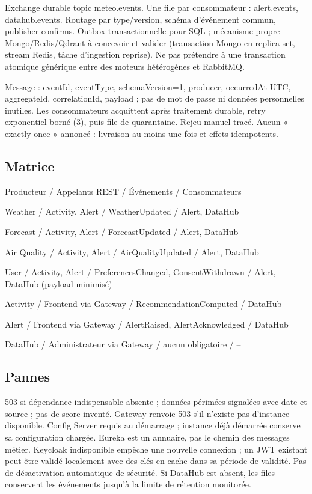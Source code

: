 \documentclass[10pt,a4paper]{article}
\begin{document}
Exchange durable topic meteo.events. Une file par consommateur : alert.events, datahub.events. Routage par type/version, schéma d'événement commun, publisher confirms. Outbox transactionnelle pour SQL ; mécanisme propre Mongo/Redis/Qdrant à concevoir et valider (transaction Mongo en replica set, stream Redis, tâche d'ingestion reprise). Ne pas prétendre à une transaction atomique générique entre des moteurs hétérogènes et RabbitMQ.\par

Message : eventId, eventType, schemaVersion=1, producer, occurredAt UTC, aggregateId, correlationId, payload ; pas de mot de passe ni données personnelles inutiles. Les consommateurs acquittent après traitement durable, retry exponentiel borné (3), puis file de quarantaine. Rejeu manuel tracé. Aucun « exactly once » annoncé : livraison au moins une fois et effets idempotents.\par

\subsection*{Matrice}

Producteur / Appelants REST / Événements / Consommateurs\par
Weather / Activity, Alert / WeatherUpdated / Alert, DataHub\par
Forecast / Activity, Alert / ForecastUpdated / Alert, DataHub\par
Air Quality / Activity, Alert / AirQualityUpdated / Alert, DataHub\par
User / Activity, Alert / PreferencesChanged, ConsentWithdrawn / Alert, DataHub (payload minimisé)\par
Activity / Frontend via Gateway / RecommendationComputed / DataHub\par
Alert / Frontend via Gateway / AlertRaised, AlertAcknowledged / DataHub\par
DataHub / Administrateur via Gateway / aucun obligatoire /  -- \par

\subsection*{Pannes}

503 si dépendance indispensable absente ; données périmées signalées avec date et source ; pas de score inventé. Gateway renvoie 503 s'il n'existe pas d'instance disponible. Config Server requis au démarrage ; instance déjà démarrée conserve sa configuration chargée. Eureka est un annuaire, pas le chemin des messages métier. Keycloak indisponible empêche une nouvelle connexion ; un JWT existant peut être validé localement avec des clés en cache dans sa période de validité. Pas de désactivation automatique de sécurité. Si DataHub est absent, les files conservent les événements jusqu'à la limite de rétention monitorée.\par
\clearpage
\end{document}

